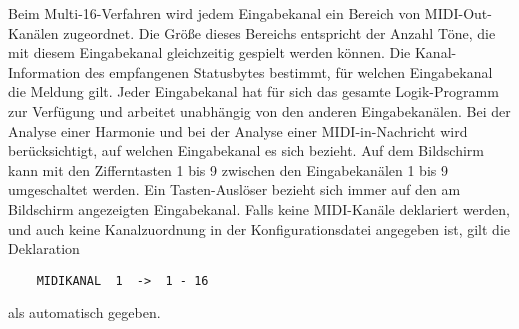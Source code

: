 Beim Multi-16-Verfahren wird
jedem Eingabekanal ein Bereich von MIDI-Out-Kanälen zugeordnet. Die Größe
dieses Bereichs entspricht der Anzahl Töne,
die mit diesem Eingabekanal gleichzeitig gespielt werden können.
Die Kanal-Information des empfangenen Statusbytes bestimmt, für
welchen Eingabekanal die Meldung gilt.
Jeder Eingabekanal hat für sich das gesamte Logik-Programm
zur Verfügung und arbeitet unabhängig von den anderen Eingabekanälen.
Bei der Analyse einer Harmonie und bei der Analyse einer MIDI-in-Nachricht
wird berücksichtigt, auf welchen Eingabekanal es sich bezieht.
Auf dem Bildschirm kann mit den Zifferntasten 1 bis 9 zwischen den
Eingabekanälen 1 bis 9 umgeschaltet werden. Ein Tasten-Auslöser
bezieht sich immer auf den am Bildschirm angezeigten Eingabekanal.
Falls keine MIDI-Kanäle deklariert werden, und auch keine Kanalzuordnung
in der Konfigurationsdatei angegeben ist,
gilt die Deklaration
\begin{lstlisting}
	MIDIKANAL  1  ->  1 - 16
\end{lstlisting}
als automatisch gegeben.




